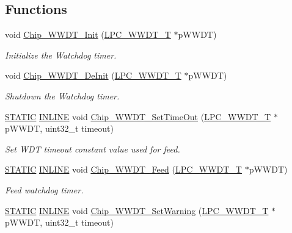 \subsection*{Functions}
\begin{DoxyCompactItemize}
\item 
void \hyperlink{group___w_w_d_t__18_x_x__43_x_x_gab4cdf632b42394855a6b8cf969f49693}{Chip\+\_\+\+W\+W\+D\+T\+\_\+\+Init} (\hyperlink{struct_l_p_c___w_w_d_t___t}{L\+P\+C\+\_\+\+W\+W\+D\+T\+\_\+T} $\ast$p\+W\+W\+DT)
\begin{DoxyCompactList}\small\item\em Initialize the Watchdog timer. \end{DoxyCompactList}\item 
void \hyperlink{group___w_w_d_t__18_x_x__43_x_x_gab536f1a59f06be21a3d9880dffd9f99b}{Chip\+\_\+\+W\+W\+D\+T\+\_\+\+De\+Init} (\hyperlink{struct_l_p_c___w_w_d_t___t}{L\+P\+C\+\_\+\+W\+W\+D\+T\+\_\+T} $\ast$p\+W\+W\+DT)
\begin{DoxyCompactList}\small\item\em Shutdown the Watchdog timer. \end{DoxyCompactList}\item 
\hyperlink{group___l_p_c___types___public___macros_ga10b2d890d871e1489bb02b7e70d9bdfb}{S\+T\+A\+T\+IC} \hyperlink{spifi__18xx__43xx_8h_a2eb6f9e0395b47b8d5e3eeae4fe0c116}{I\+N\+L\+I\+NE} void \hyperlink{group___w_w_d_t__18_x_x__43_x_x_ga3147a15042f4276588c83e98b0a1b996}{Chip\+\_\+\+W\+W\+D\+T\+\_\+\+Set\+Time\+Out} (\hyperlink{struct_l_p_c___w_w_d_t___t}{L\+P\+C\+\_\+\+W\+W\+D\+T\+\_\+T} $\ast$p\+W\+W\+DT, uint32\+\_\+t timeout)
\begin{DoxyCompactList}\small\item\em Set W\+DT timeout constant value used for feed. \end{DoxyCompactList}\item 
\hyperlink{group___l_p_c___types___public___macros_ga10b2d890d871e1489bb02b7e70d9bdfb}{S\+T\+A\+T\+IC} \hyperlink{spifi__18xx__43xx_8h_a2eb6f9e0395b47b8d5e3eeae4fe0c116}{I\+N\+L\+I\+NE} void \hyperlink{group___w_w_d_t__18_x_x__43_x_x_ga88db6aef307efd5cbc629695c4678006}{Chip\+\_\+\+W\+W\+D\+T\+\_\+\+Feed} (\hyperlink{struct_l_p_c___w_w_d_t___t}{L\+P\+C\+\_\+\+W\+W\+D\+T\+\_\+T} $\ast$p\+W\+W\+DT)
\begin{DoxyCompactList}\small\item\em Feed watchdog timer. \end{DoxyCompactList}\item 
\hyperlink{group___l_p_c___types___public___macros_ga10b2d890d871e1489bb02b7e70d9bdfb}{S\+T\+A\+T\+IC} \hyperlink{spifi__18xx__43xx_8h_a2eb6f9e0395b47b8d5e3eeae4fe0c116}{I\+N\+L\+I\+NE} void \hyperlink{group___w_w_d_t__18_x_x__43_x_x_ga83ecb3bc2ce68b3deb8343a7d76e3d7e}{Chip\+\_\+\+W\+W\+D\+T\+\_\+\+Set\+Warning} (\hyperlink{struct_l_p_c___w_w_d_t___t}{L\+P\+C\+\_\+\+W\+W\+D\+T\+\_\+T} $\ast$p\+W\+W\+DT, uint32\+\_\+t timeout)

\end{DoxyCompactItemize}
